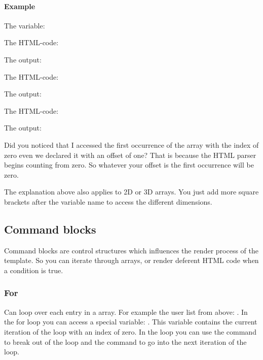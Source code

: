 \documentclass[letterpaper,10pt,english]{sphinxmanual}
\begin{document}
\paragraph{Example}
\label{html-parser:example}\label{html-parser:array-example}
The variable: 

The HTML-code: 

The output: 

The HTML-code: 

The output: 

The HTML-code: 

The output: 

Did you noticed that I accessed the first occurrence of the array with the index of zero even we declared it with an offset of one? That is because the HTML parser begins counting from zero. So whatever your offset is the first occurrence will be zero.

The explanation above also applies to 2D or 3D arrays. You just add more square brackets after the variable name to access the different dimensions.


\subsection{Command blocks}
\label{html-parser:command-blocks}
Command blocks are control structures which influences the render process of the template. So you can iterate through arrays, or render deferent HTML code when a condition is true.


\subsubsection{For}
\label{html-parser:for}
Can loop over each entry in a array. For example the user list from above: {\hyperref[html\string-parser:template\string-example]{}}. In the for loop you can access a special variable: . This variable contains the current iteration of the loop with an index of zero. In the loop you can use the  command to break out of the loop and the  command to go into the next iteration of the loop.
\end{document}
